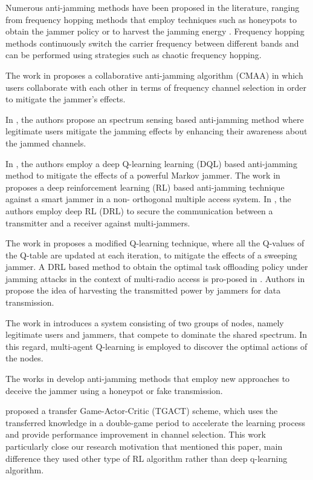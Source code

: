 \documentclass[letterpaper%
, oneside%
, 12pt%
,thesepararticles%
, english%
,creativecommons,hyperref, withAlgo2e%
]{thETS}
\begin{document}
Numerous anti-jamming methods have been proposed in the literature, ranging from frequency hopping \cite{6117758} \cite{8567751} methods that employ techniques such as honeypots to obtain the jammer policy or to harvest the jamming energy \cite{Bhunia2018CRHoneynetAC} \cite{9149223}. Frequency hopping methods continuously switch the carrier frequency between different bands and can be performed using strategies such as chaotic frequency hopping.

The work in \cite{8664589} proposes a collaborative anti-jamming algorithm (CMAA) in which users collaborate with each other in terms of frequency channel selection in order to mitigate the jammer's effects. 

In \cite{9149223}, the authors propose an spectrum sensing based anti-jamming method where legitimate users mitigate the jamming effects by enhancing their awareness about the jammed channels.

In \cite{8761848}, the authors employ a deep Q-learning learning (DQL) based anti-jamming method to mitigate the effects of a powerful Markov jammer. The work in \cite{Xiao2018ReinforcementLN} proposes a deep reinforcement learning (RL) based anti-jamming technique against a smart jammer in a non- orthogonal multiple access system. In \cite{8314744}, the authors employ deep RL (DRL) to secure the communication between a transmitter and a receiver against multi-jammers. 


The work in \cite{Slimeni2018AMQ} proposes a modified Q-learning technique, where all the Q-values of the Q-table are updated at each iteration, to mitigate the effects of a sweeping jammer. A DRL based method to obtain the optimal task offloading policy under jamming attacks in the context of multi-radio access is pro-posed in \cite{9136780}. Authors in \cite{8792369} propose the idea of harvesting the transmitted power by jammers for data transmission. 

The work \cite{CCRN_Dastangoo_Fossa} in introduces a system consisting of two groups of nodes, namely legitimate users and jammers, that compete to dominate the shared spectrum. In this regard, multi-agent Q-learning is employed to discover the optimal actions of the nodes. 

The works in \cite{8371277} develop anti-jamming methods that employ new approaches to deceive the jammer using a honeypot or fake transmission. 

\cite{9383211} proposed a transfer Game-Actor-Critic (TGACT) scheme, which uses the transferred knowledge in a double-game period to accelerate the learning process and provide performance improvement in channel selection. This work particularly close our research motivation that mentioned this paper, main difference they used other type of RL algorithm rather than deep q-learning algorithm.
\end{document}
